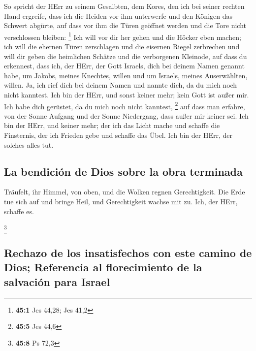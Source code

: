  So spricht der HErr zu seinem Gesalbten, dem Kores, den
ich bei seiner rechten Hand ergreife, dass ich die Heiden vor ihm
unterwerfe und den Königen das Schwert abgürte, auf dass vor ihm die
Türen geöffnet werden und die Tore nicht verschlossen bleiben:
\footnote{\textbf{45:1} Jes 44,28; Jes 41,2}  Ich will vor
dir her gehen und die Höcker eben machen; ich will die ehernen Türen
zerschlagen und die eisernen Riegel zerbrechen  und will
dir geben die heimlichen Schätze und die verborgenen Kleinode, auf dass
du erkennest, dass ich, der HErr, der Gott Israels, dich bei deinem
Namen genannt habe,  um Jakobs, meines Knechtes, willen
und um Israels, meines Auserwählten, willen. Ja, ich rief dich bei
deinem Namen und nannte dich, da du mich noch nicht kanntest.
 Ich bin der HErr, und sonst keiner mehr; kein Gott ist
außer mir. Ich habe dich gerüstet, da du mich noch nicht kanntest,
\footnote{\textbf{45:5} Jes 44,6}  auf dass man erfahre,
von der Sonne Aufgang und der Sonne Niedergang, dass außer mir keiner
sei. Ich bin der HErr, und keiner mehr;  der ich das Licht
mache und schaffe die Finsternis, der ich Frieden gebe und schaffe das
Übel. Ich bin der HErr, der solches alles tut.

\hypertarget{la-bendiciuxf3n-de-dios-sobre-la-obra-terminada}{%
\subsection{La bendición de Dios sobre la obra
terminada}\label{la-bendiciuxf3n-de-dios-sobre-la-obra-terminada}}

 Träufelt, ihr Himmel, von oben, und die Wolken regnen
Gerechtigkeit. Die Erde tue sich auf und bringe Heil, und Gerechtigkeit
wachse mit zu. Ich, der HErr, schaffe es.

\footnote{\textbf{45:8} Ps 72,3}

\hypertarget{rechazo-de-los-insatisfechos-con-este-camino-de-dios-referencia-al-florecimiento-de-la-salvaciuxf3n-para-israel}{%
\subsection{Rechazo de los insatisfechos con este camino de Dios;
Referencia al florecimiento de la salvación para
Israel}\label{rechazo-de-los-insatisfechos-con-este-camino-de-dios-referencia-al-florecimiento-de-la-salvaciuxf3n-para-israel}}

